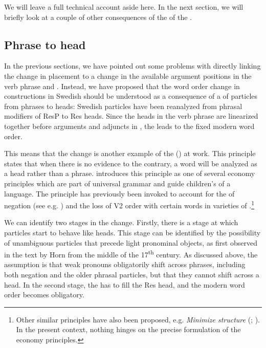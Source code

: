 \documentclass[output=paper]{langscibook}
\begin{document}
We will leave a full technical account aside here. In the next section, we will briefly look at a couple of other consequences of the  of the . 


\subsection{Phrase to head}\label{sec:lalu:6.3}

In the previous sections, we have pointed out some problems with directly linking the change in  placement to a change in the available argument positions in the verb phrase and . Instead, we have proposed that the word order change in  constructions in Swedish should be understood as a consequence of a  of particles from phrases to heads: Swedish particles have been reanalyzed from phrasal modifiers of ResP to Res heads. Since the heads in the verb phrase are linearized together before arguments and adjuncts in , the  leads to the fixed modern word order. 



This means that the change is another example of the  (\citealt{van_Gelderen2004}) at work. This principle states that when there is no evidence to the contrary, a word will be analyzed as a head rather than a phrase. \citet{van_Gelderen2004} introduces this principle as one of several economy principles which are part of universal grammar and guide children’s  of a language. The principle has previously been invoked to account for the  of negation (see e.g. \citealt{Van_gelderen2008}) and the loss of V2 order with certain  words in varieties of  \citep{WestergaardEtAl2017}.\footnote{Other similar principles have also been proposed, e.g. \textit{Minimize structure} (\citealt{CardinalettiStarke1999}; \citealt{BreitbarthEtAl2020}). In the present context, nothing hinges on the precise formulation of the economy principles.}  



We can identify two stages in the change. Firstly, there is a stage at which particles start to behave like heads. This stage can be identified by the possibility of unambiguous particles that precede light pronominal objects, as first observed in the text by Horn from the middle of the 17\textsuperscript{th} century. As discussed above, the assumption is that weak pronouns obligatorily shift across  phrases, including both negation and the older phrasal particles, but that they cannot shift across a head. In the second stage, the  has to fill the Res head, and the modern word order becomes obligatory. 
\end{document}
